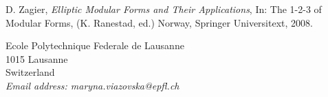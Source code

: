 \begin{thebibliography}{10}


   {\sc D. Zagier}, {\em Elliptic Modular Forms and Their Applications}, In:  The 1-2-3 of Modular Forms, (K. Ranestad, ed.) Norway, Springer Universitext, 2008.
  \end{thebibliography}

  \newpage

  {\footnotesize
  \noindent
  Ecole Polytechnique Federale de Lausanne\\
  1015 Lausanne\\
  Switzerland\\
  {\it Email address: maryna.viazovska@epfl.ch}}
